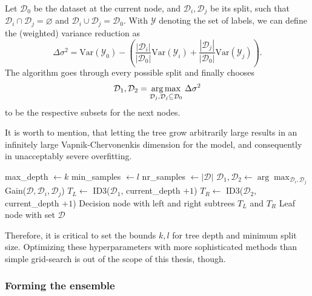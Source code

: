 \documentclass[english, 12pt, a4paper, sci, utf8, a-2b, online]{aaltothesis}
\begin{document}
Let $\mathcal{D}_0$ be the dataset at the current node, and $\mathcal{D}_i, \mathcal{D}_j$ be its split, such that $\mathcal{D}_i \cap \mathcal{D}_j = \varnothing$
and $\mathcal{D}_i \cup \mathcal{D}_j = \mathcal{D}_0$. With $\mathcal{Y}$ denoting the set of labels, we can define the (weighted) variance reduction as
%
\begin{equation}
  \Delta\sigma^2 = \text{Var}(\mathcal{Y}_0) - \left(\frac{|\mathcal{D}_i|}{|\mathcal{D}_0|}\text{Var}(\mathcal{Y}_i) + \frac{|\mathcal{D}_j|}{|\mathcal{D}_0|}\text{Var}(\mathcal{Y}_j)\right).
\end{equation}
%
The algorithm goes through every possible split and finally chooses
%
\begin{equation*}
  \mathcal{D}_1, \mathcal{D}_2 = \underset{\mathcal{D}_j, \mathcal{D}_j \subseteq \mathcal{D}_0}{\arg \max}\hspace{1mm}\Delta\sigma^2
\end{equation*}
%
to be the respective subsets for the next nodes.

It is worth to mention, that letting the tree grow arbitrarily large results in an infinitely large Vapnik-Chervonenkis dimension for the model, and consequently in unacceptably
severe overfitting.~\cite{shalev-shwartz}
%
\begin{algorithm}
  \caption{ID3 variant for regression}\label{alg:id3}
  \begin{algorithmic}[1]
    \State max\_depth $\gets k$
    \State min\_samples $\gets l$
    \State nr\_samples $\gets |\mathcal{D}|$
    \State $\mathcal{D}_1, \mathcal{D}_2 \gets \arg \max_{\mathcal{D}_i, \mathcal{D}_j}$ Gain($\mathcal{D}, \mathcal{D}_i, \mathcal{D}_j$)
    \State $T_L \gets$ ID3($\mathcal{D}_1$, current\_depth $+1$)
    \State $T_R \gets$ ID3($\mathcal{D}_2$, current\_depth $+1$)
    \State \Return Decision node with left and right subtrees $T_L$ and $T_R$
    \Else
    \State \Return Leaf node with set $\mathcal{D}$
    \EndIf
    \EndProcedure
  \end{algorithmic}
\end{algorithm}
%
Therefore, it is critical to set the bounds $k,l$ for tree depth and minimum split size. Optimizing these hyperparameters with more sophisticated methods than simple grid-search is out of the scope
of this thesis, though.

\subsubsection{Forming the ensemble}
\end{document}
